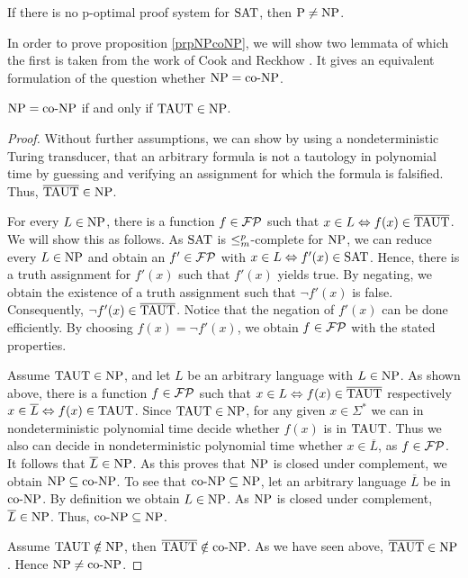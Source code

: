   \begin{corollary}
    If there is no p-optimal proof system for \(\text{SAT}\), then \(\text{P} \neq \text{NP}\).
  \end{corollary}  
  
  In order to prove proposition \ref{prpNPcoNP}, we will show two lemmata of which the first is taken from the work of Cook and Reckhow \cite{CR79}. It gives an equivalent formulation of the question whether \(\text{NP} = \text{co-NP}\).

  \begin{lemma} \label{lemNPisCoNP}
   \(\text{NP} = \text{co-NP}\) if and only if \(\text{TAUT} \in \text{NP}\).
  \end{lemma}

  \begin{proof}
    Without further assumptions, we can show by using a nondeterministic Turing transducer, that an arbitrary formula is not a tautology in polynomial time by guessing and verifying an assignment for which the formula is falsified. Thus, \(\overline{\text{TAUT}} \in \text{NP}\).

    For every \(L \in \text{NP}\), there is a function \(f \in \mathcal{FP}\) such that \(x \in L \Leftrightarrow f(x) \in \overline{\text{TAUT}}\). We will show this as follows. As \(\text{SAT}\) is \(\leq_{m}^{p}\)-complete for \(\text{NP}\), we can reduce every \(L \in \text{NP}\) and obtain an \(f' \in \mathcal{FP}\) with \(x \in L \Leftrightarrow f'(x) \in \text{SAT}\). Hence, there is a truth assignment for \(f'(x)\) such that \(f'(x)\) yields true. By negating, we obtain the existence of a truth assignment such that \(\neg f'(x)\) is false. Consequently, \(\neg f'(x) \in \overline{\text{TAUT}}\). Notice that the negation of \(f'(x)\) can be done efficiently. By choosing \(f(x) = \neg f'(x)\), we obtain \(f \in \mathcal{FP}\) with the stated properties.

    Assume \(\text{TAUT} \in \text{NP}\), and let \(L\) be an arbitrary language with \(L \in \text{NP}\). As shown above, there is a function \(f \in \mathcal{FP}\) such that \(x \in L \Leftrightarrow f(x) \in \overline{\text{TAUT}}\) respectively \(x \in \overline{L} \Leftrightarrow f(x) \in \text{TAUT}\). Since \(\text{TAUT} \in \text{NP}\), for any given \(x \in \Sigma^*\) we can in nondeterministic polynomial time decide whether \(f(x)\) is in \(\text{TAUT}\). Thus we also can decide in nondeterministic polynomial time whether \(x \in \overline{L}\), as \(f \in \mathcal{FP}\). It follows that \(\overline{L} \in \text{NP}\). As this proves that \(\text{NP}\) is closed under complement, we obtain \(\text{NP} \subseteq \text{co-NP}\). To see that \(\text{co-NP} \subseteq \text{NP}\), let an arbitrary language \(\overline{L}\) be in \(\text{co-NP}\). By definition we obtain \(L \in \text{NP}\). As \(\text{NP}\) is closed under complement, \(\overline{L} \in \text{NP}\). Thus, \(\text{co-NP} \subseteq \text{NP}\).

    Assume \(\text{TAUT} \notin \text{NP}\), then \(\overline{\text{TAUT}} \notin \text{co-NP}\). As we have seen above, \(\overline{\text{TAUT}} \in \text{NP}\). Hence \(\text{NP} \neq \text{co-NP}\).
  \end{proof}

